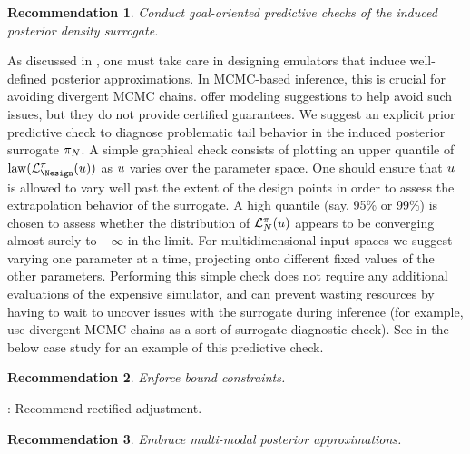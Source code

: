 \documentclass[12pt]{article}
\newtheorem{rec}{Recommendation}
\begin{document}
\begin{rec} \label{rec:pred-check-tails}
Conduct goal-oriented predictive checks of the induced posterior density surrogate.
\end{rec}
As discussed in , one must take care in designing emulators that
induce well-defined posterior approximations. In MCMC-based inference, this is crucial for
avoiding divergent MCMC chains. 
offer modeling suggestions to help avoid such issues, but they do not provide certified 
guarantees. We suggest an explicit prior predictive check to diagnose problematic 
tail behavior in the induced posterior surrogate $\postEm[\Ndesign]$. A simple graphical
check consists of plotting an upper quantile of $\mathrm{law}(\lpostEm[\Nesign](\Par))$ 
as $\Par$ varies over the parameter space. One should ensure that $\Par$ is allowed to 
vary well past the extent of the design points in order to assess the extrapolation behavior 
of the surrogate. A high quantile (say, 95\% or 99\%) is chosen to assess whether 
the distribution of $\lpostEm[\Ndesign](\Par)$ appears to be converging almost surely 
to $-\infty$ in the limit. For multidimensional input spaces we suggest varying one 
parameter at a time, projecting onto different fixed values of the other parameters.
Performing this simple check does not require any additional 
evaluations of the expensive simulator, and can prevent wasting resources by having
to wait to uncover issues with the surrogate during inference (for example, 
\citet{emPostDens} use divergent MCMC chains as a sort of surrogate diagnostic check).
 See  in the below case study for an example
 of this predictive check.

\begin{rec} \label{rec:bound-constraints}
Enforce bound constraints.
\end{rec}

\todo: Recommend rectified adjustment.

\begin{rec} \label{rec:multimodal-post-approx}
Embrace multi-modal posterior approximations.
\end{rec}
\end{document}
